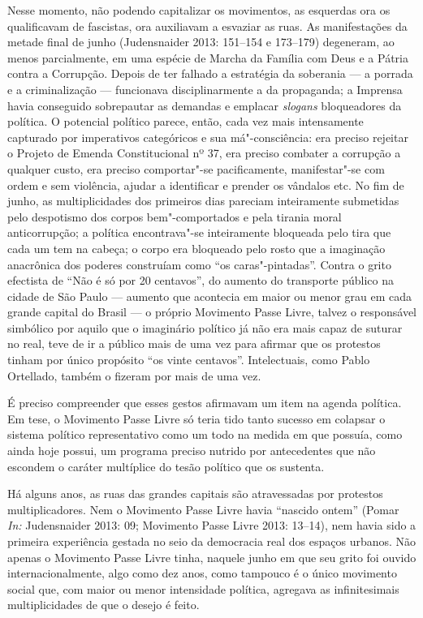 Nesse momento, não podendo capitalizar os movimentos, as esquerdas ora
os qualificavam de fascistas, ora auxiliavam a esvaziar as ruas. As
manifestações da metade final de junho (Judensnaider 2013: 151--154 e
173--179) degeneram, ao menos parcialmente, em uma espécie de Marcha da
Família com Deus e a Pátria contra a Corrupção. Depois de ter falhado a
estratégia da soberania --- a porrada e a criminalização --- funcionava
disciplinarmente a da propaganda; a Imprensa havia conseguido
sobrepautar as demandas e emplacar \emph{slogans }bloqueadores da
política. O potencial político parece, então, cada vez mais intensamente
capturado por imperativos categóricos e sua má"-consciência: era preciso
rejeitar o Projeto de Emenda Constitucional nº 37, era preciso combater
a corrupção a qualquer custo, era preciso comportar"-se pacificamente,
manifestar"-se com ordem e sem violência, ajudar a identificar e prender
os vândalos etc. No fim de junho, as multiplicidades dos primeiros dias
pareciam inteiramente submetidas pelo despotismo dos corpos
bem"-comportados e pela tirania moral anticorrupção; a política
encontrava"-se inteiramente bloqueada pelo tira que cada um tem na
cabeça; o corpo era bloqueado pelo rosto que a imaginação anacrônica dos
poderes construíam como ``os caras"-pintadas''. Contra o grito efectista
de ``Não é só por 20 centavos'', do aumento do transporte público na
cidade de São Paulo --- aumento que acontecia em maior ou menor grau em
cada grande capital do Brasil --- o próprio Movimento Passe Livre, talvez
o responsável simbólico por aquilo que o imaginário político já não era
mais capaz de suturar no real, teve de ir a público mais de uma vez para
afirmar que os protestos tinham por único propósito ``os vinte
centavos''. Intelectuais, como Pablo Ortellado, também o fizeram por
mais de uma vez.

É preciso compreender que esses gestos afirmavam um item na agenda
política. Em tese, o Movimento Passe Livre só teria tido tanto sucesso
em colapsar o sistema político representativo como um todo na medida em
que possuía, como ainda hoje possui, um programa preciso nutrido por
antecedentes que não escondem o caráter multíplice do tesão político que
os sustenta.

Há alguns anos, as ruas das grandes capitais são atravessadas por
protestos multiplicadores. Nem o Movimento Passe Livre havia ``nascido
ontem'' (Pomar \emph{In: }Judensnaider 2013: 09; Movimento Passe Livre
2013: 13--14), nem havia sido a primeira experiência gestada
no seio da democracia real dos espaços urbanos. Não apenas o Movimento
Passe Livre tinha, naquele junho em que seu grito foi ouvido
internacionalmente, algo como dez anos, como tampouco é o único
movimento social que, com maior ou menor intensidade política, agregava
as infinitesimais multiplicidades de que o desejo é feito.

